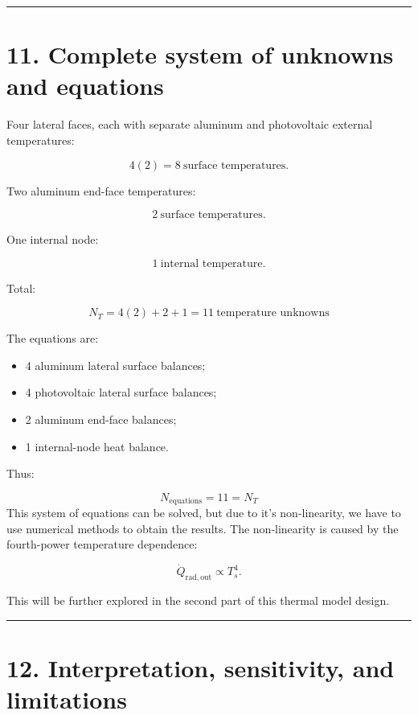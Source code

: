 \documentclass[
]{book}
\providecommand{\tightlist}{%
  \setlength{\itemsep}{0pt}\setlength{\parskip}{0pt}}
\begin{document}
\begin{center}\rule{0.5\linewidth}{0.5pt}\end{center}

\section{11. Complete system of unknowns and equations}\label{complete-system-of-unknowns-and-equations}

Four lateral faces, each with separate aluminum and photovoltaic external temperatures:

\[
4(2)=8\ \text{surface temperatures}.
\]

Two aluminum end-face temperatures:

\[
2\ \text{surface temperatures}.
\]

One internal node:

\[
1\ \text{internal temperature}.
\]

Total:

\[
\boxed{N_T=4(2)+2+1=11\ \text{temperature unknowns}}
\]

The equations are:

\begin{itemize}
\tightlist
\item
  4 aluminum lateral surface balances;
\item
  4 photovoltaic lateral surface balances;
\item
  2 aluminum end-face balances;
\item
  1 internal-node heat balance.
\end{itemize}

Thus:

\[
\boxed{N_{\mathrm{equations}}=11=N_T}
\] This system of equations can be solved, but due to it's non-linearity, we have to use numerical methods to obtain the results. The non-linearity is caused by the fourth-power temperature dependence:

\[
\dot Q_{\mathrm{rad,out}}\propto T_s^4.
\]

This will be further explored in the second part of this thermal model design.

\begin{center}\rule{0.5\linewidth}{0.5pt}\end{center}

\section{12. Interpretation, sensitivity, and limitations}\label{interpretation-sensitivity-and-limitations}
\end{document}
